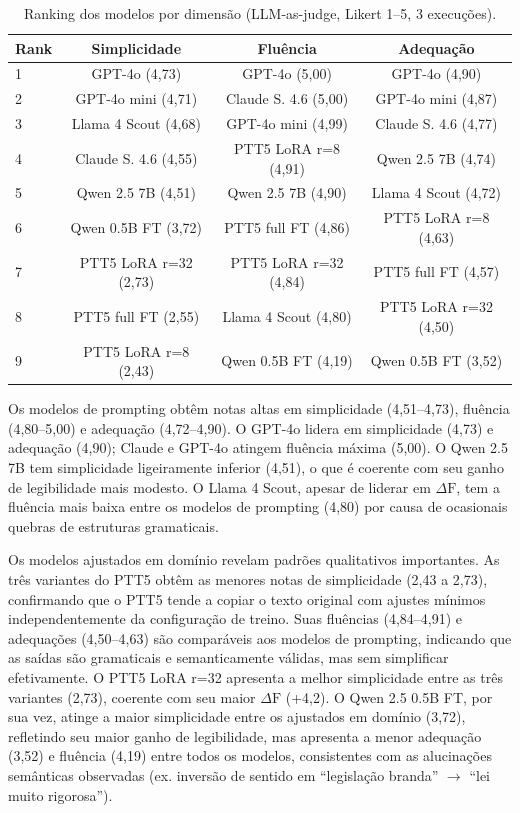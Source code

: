 \documentclass[a4paper, twocolumn, 11pt, twoside]{article}
\begin{document}
\begin{table}[htbp]
\centering
\caption{Ranking dos modelos por dimensão (LLM-as-judge,
         Likert 1--5, 3 execuções).}
\label{tab:llmjudge_ranking}
\footnotesize
\setlength{\tabcolsep}{3pt}
\begin{tabular}{l c c c}
\toprule
Rank & Simplicidade & Fluência & Adequação \\
\midrule
1 & GPT-4o (4,73)       & GPT-4o (5,00)        & GPT-4o (4,90) \\
2 & GPT-4o mini (4,71)   & Claude S. 4.6 (5,00) & GPT-4o mini (4,87) \\
3 & Llama 4 Scout (4,68) & GPT-4o mini (4,99)   & Claude S. 4.6 (4,77) \\
4 & Claude S. 4.6 (4,55) & PTT5 LoRA r=8 (4,91)      & Qwen 2.5 7B (4,74) \\
5 & Qwen 2.5 7B (4,51)   & Qwen 2.5 7B (4,90)   & Llama 4 Scout (4,72) \\
6 & Qwen 0.5B FT (3,72)  & PTT5 full FT (4,86)  & PTT5 LoRA r=8 (4,63) \\
7 & PTT5 LoRA r=32 (2,73)     & PTT5 LoRA r=32 (4,84)     & PTT5 full FT (4,57) \\
8 & PTT5 full FT (2,55)  & Llama 4 Scout (4,80) & PTT5 LoRA r=32 (4,50) \\
9 & PTT5 LoRA r=8 (2,43)      & Qwen 0.5B FT (4,19)  & Qwen 0.5B FT (3,52) \\
\bottomrule
\end{tabular}
\end{table}

Os modelos de prompting obtêm notas altas em simplicidade
(4,51--4,73), fluência (4,80--5,00) e adequação (4,72--4,90).
O GPT-4o lidera em simplicidade (4,73) e adequação (4,90);
Claude e GPT-4o atingem fluência máxima (5,00).
O Qwen 2.5 7B tem simplicidade ligeiramente inferior
(4,51), o que é coerente com seu ganho de legibilidade mais modesto.
O Llama 4 Scout, apesar de liderar em $\Delta \mathrm{F}$, tem a fluência
mais baixa entre os modelos de prompting (4,80) por causa de
ocasionais quebras de estruturas gramaticais.

Os modelos ajustados em domínio revelam padrões qualitativos importantes.
As três variantes do PTT5 obtêm as menores notas de simplicidade
(2,43 a 2,73), confirmando que o PTT5 tende a copiar o texto original
com ajustes mínimos independentemente da configuração de treino.
Suas fluências (4,84--4,91) e adequações (4,50--4,63) são comparáveis
aos modelos de prompting, indicando que as saídas são gramaticais
e semanticamente válidas, mas sem simplificar efetivamente.
O PTT5 LoRA r=32 apresenta a melhor simplicidade entre as três
variantes (2,73), coerente com seu maior $\Delta \mathrm{F}$ (+4,2).
O Qwen 2.5 0.5B FT, por sua vez, atinge a maior simplicidade entre
os ajustados em domínio (3,72), refletindo seu maior ganho de legibilidade,
mas apresenta a menor adequação (3,52) e fluência (4,19) entre todos
os modelos, consistentes com as alucinações semânticas observadas
(ex. inversão de sentido em ``legislação branda'' $\to$ ``lei muito
rigorosa'').
\end{document}
